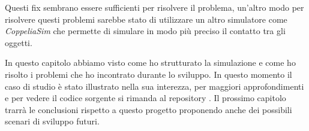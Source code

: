 Questi fix sembrano essere sufficienti per risolvere il problema, un'altro modo per risolvere questi problemi sarebbe stato di utilizzare un altro simulatore come \textit{CoppeliaSim} che permette di simulare in modo più preciso il contatto tra gli oggetti.

In questo capitolo abbiamo visto come ho strutturato la simulazione e come ho risolto i problemi che ho incontrato durante lo sviluppo. In questo momento il caso di studio è stato illustrato nella sua interezza, per maggiori approfondimenti e per vedere il codice sorgente si rimanda al repository \cite{gitrepo}. 
Il prossimo capitolo trarrà le conclusioni rispetto a questo progetto proponendo anche dei possibili scenari di sviluppo futuri.

